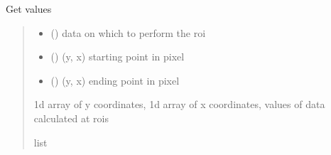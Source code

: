 \documentclass[letterpaper,10pt,english]{sphinxmanual}
\begin{document}
\begin{fulllineitems}
\label{\detokenize{micropolarray.processing:micropolarray.processing.linear_roi.linear_roi}}
\pysigstartsignatures
{}
\pysigstopsignatures
\sphinxAtStartPar
Get values
\begin{quote}\begin{description}
\begin{itemize}
\item {} 
\sphinxAtStartPar
{} () \textendash{} data on which to perform the roi

\item {} 
\sphinxAtStartPar
{} () \textendash{} (y, x) starting point in pixel

\item {} 
\sphinxAtStartPar
{} () \textendash{} (y, x) ending point in pixel

\end{itemize}

\sphinxAtStartPar
1d array of y coordinates, 1d array of x coordinates, values of data calculated at rois

\sphinxAtStartPar
list

\end{description}\end{quote}

\end{fulllineitems}

\end{document}
